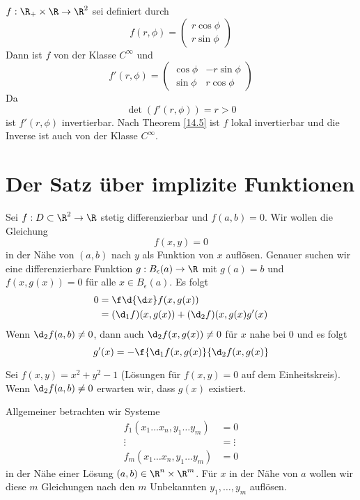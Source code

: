 \documentclass{mycourse}
\begin{document}
\begin{ex*}
$f:\R_+\times \R \to \R^2$ sei definiert durch
\[
f(r,\phi) = \begin{pmatrix}r\cos \phi \\ r\sin \phi\end{pmatrix}
\]
Dann ist $f$ von der Klasse $C^\infty$ und
\[
f'(r,\phi) = \begin{pmatrix} \cos \phi & -r\sin \phi \\ \sin\phi & r\cos\phi\end{pmatrix}
\]
Da
\[
\det(f'(r,\phi)) = r > 0
\]
ist $f'(r,\phi)$ invertierbar.
Nach Theorem \ref{14.5} ist $f$ lokal invertierbar und die Inverse ist auch von der Klasse $C^\infty$.
\end{ex*}


\section{Der Satz über implizite Funktionen}

Sei $f:D\subset \R^2 \to \R$ stetig differenzierbar und $f(a,b)=0$.
Wir wollen die Gleichung
\[
f(x,y) = 0
\]
in der Nähe von $(a,b)$ nach $y$ als Funktion von $x$ auflösen.
Genauer suchen wir eine differenzierbare Funktion $g:B_\epsilon(a) \to \R$ mit $g(a)=b$ und $f(x,g(x))=0$ für alle $x\in B_\epsilon (a)$.
Es folgt
\begin{align*}
0 &= \f \d{\d x} f(x,g(x)) \\
&= (\d_1f)(x,g(x)) +(\d_2f)(x,g(x) g'(x)
\end{align*}
Wenn $\d_2f(a,b)\neq 0$, dann auch $\d_2f(x,g(x)) \neq 0$ für $x$ nahe bei $0$ und es folgt
\[
g'(x) = -\f {\d_1f(x,g(x)}{\d_2f(x,g(x)}
\]

\begin{ex*}
Sei $f(x,y) = x^2+y^2 - 1$ (Lösungen für $f(x,y)=0$ auf dem Einheitskreis).
Wenn $\d_2f(a,b)\neq 0$ erwarten wir, dass $g(x)$ existiert.
\end{ex*}

Allgemeiner betrachten wir Systeme
\begin{align*}
f_1(x_1\dotsc x_n, y_1\dotsc y_m) &= 0\\
\vdots \qquad &= \vdots \\
f_m(x_1\dotsc x_n, y_1\dotsc y_m) &= 0
\end{align*}
in der Nähe einer Lösung $(a,b)\in \R^n\times \R^m$.
Für $x$ in der Nähe von $a$ wollen wir diese $m$ Gleichungen nach den $m$ Unbekannten $y_1,\dotsc, y_m$ auflösen.
\end{document}
